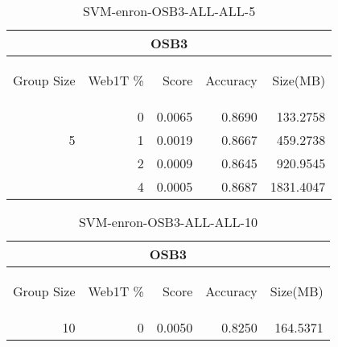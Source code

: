 \begin{center}
\begin{table}[htbp] 
 \begin{center}
\begin{tabular}{ | r | r | r | r | r |}
\hline
\multicolumn{5}{|c|}{OSB3}\\
\hline
\begin{sideways}Group Size\end{sideways} & \begin{sideways}Web1T \%\end{sideways} & \begin{sideways}Score\end{sideways} & \begin{sideways}Accuracy\end{sideways} & \begin{sideways}Size(MB)\end{sideways}\\
\hline
\multirow{3}{*}{5}
 & 0 & 0.0065 & 0.8690 & 133.2758\\ \cline{2-5}
 & 1 & 0.0019 & 0.8667 & 459.2738\\ \cline{2-5}
 & 2 & 0.0009 & 0.8645 & 920.9545\\ \cline{2-5}
 & 4 & 0.0005 & 0.8687 & 1831.4047\\ \cline{2-5}
\hline
\end{tabular}
\caption{SVM-enron-OSB3-ALL-ALL-5}
\label{table:SVM-enron-OSB3-ALL-ALL-5}
\end{center}
 \end{table}
\end{center}

\begin{center}
\begin{table}[htbp] 
 \begin{center}
\begin{tabular}{ | r | r | r | r | r |}
\hline
\multicolumn{5}{|c|}{OSB3}\\
\hline
\begin{sideways}Group Size\end{sideways} & \begin{sideways}Web1T \%\end{sideways} & \begin{sideways}Score\end{sideways} & \begin{sideways}Accuracy\end{sideways} & \begin{sideways}Size(MB)\end{sideways}\\
\hline
\multirow{0}{*}{10}
 & 0 & 0.0050 & 0.8250 & 164.5371\\ \cline{2-5}
\hline
\end{tabular}
\caption{SVM-enron-OSB3-ALL-ALL-10}
\label{table:SVM-enron-OSB3-ALL-ALL-10}
\end{center}
 \end{table}
\end{center}

